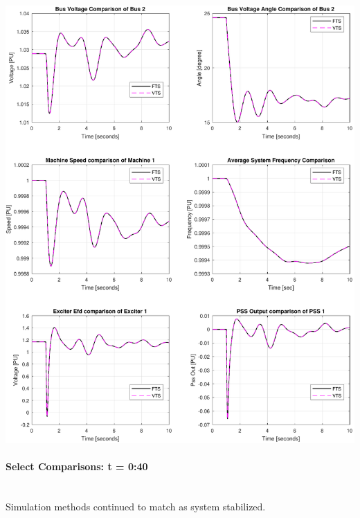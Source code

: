\documentclass[12pt]{article}
\begin{document}
\includegraphics[width=\linewidth]{MWdetailComp0}

\pagebreak
\paragraph{Select Comparisons: t = 0:40} \ \\
Simulation methods continued to match as system stabilized.\\
\end{document}
